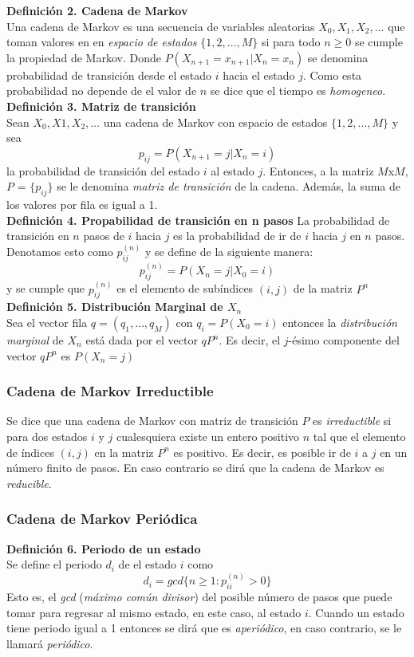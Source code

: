 \documentclass{article}
\theoremstyle{definition}
\theoremstyle{remark}
\begin{document}
\textbf{Definición 2. Cadena de Markov}\\
Una cadena de Markov es una secuencia de variables aleatorias $X_{0},X_{1},X_{2},...$ que toman valores en en \textit{espacio de estados} $\{1,2,\dots,M\}$ si para todo $n\geq0$ se cumple la propiedad de Markov. Donde $P(X_{n+1}=x_{n+1}|X_{n}=x_n)$ se denomina probabilidad de transición desde el estado $i$ hacia el estado $j$. Como esta probabilidad no depende de el valor de $n$ se dice que el tiempo es \textit{homogeneo}.\\

\textbf{Definición 3. Matriz de transición}\\
Sean $X_{0},X{1},X_{2},\dots$ una cadena de Markov con espacio de estados $\{1,2,\dots,M\}$ y sea
\[
p_{ij} = P(X_{n+1}=j|X_{n}=i)
\] 
la probabilidad de transición del estado $i$ al estado $j$. Entonces, a la matriz $M$x$M$, $P$ = $\{p_{ij}\}$ se le denomina \textit{matriz de transición} de la cadena. Además, la suma de los valores por fila es igual a 1.\\

\textbf{Definición 4. Propabilidad de transición en n pasos}
La probabilidad de transición en $n$ pasos de $i$ hacia $j$ es la probabilidad de ir de $i$ hacia $j$ en $n$ pasos. Denotamos esto como $p_{ij}^{(n)}$ y se define de la siguiente manera:
\[
p_{ij}^{(n)} = P(X_{n}=j|X_{0}=i)
\]
y se cumple que $p_{ij}^{(n)}$ es el elemento de subíndices $(i,j)$ de la matriz $P^{n}$\\

\textbf{Definición 5. Distribución Marginal de $X_{n}$}\\
Sea el vector fila $q = (q_{1},\dots,q_{M})$ con $q_{i} = P(X_{0} = i)$ entonces la \textit{distribución marginal} de $X_{n}$ está dada por el vector $qP^{n}$. Es decir, el $j$-ésimo componente del vector $qP^{n}$ es $P(X_{n} = j)$
\subsubsection{Cadena de Markov Irreductible}
Se dice que una cadena de Markov con matriz de transición $P$ es \textit{irreductible} si para dos estados $i$ y $j$ cualesquiera existe un entero positivo $n$ tal que el elemento de índices $(i,j)$ en la matriz $P^n$ es positivo. Es decir, es posible ir de $i$ a $j$ en un número finito de pasos. En caso contrario se dirá que la cadena de Markov es \textit{reducible}.

\subsubsection{Cadena de Markov Periódica}
\textbf{Definición 6. Periodo de un estado}\\
Se define el periodo $d_{i}$ de el estado $i$ como
\[
d_{i} = gcd\{n\geq1:p_{ii}^{(n)}>0\}
\]
Esto es, el \textit{gcd} (\textit{máximo común divisor}) del posible número de pasos que puede tomar para regresar al mismo estado, en este caso, al estado $i$. 
Cuando un estado tiene periodo igual a 1 entonces se dirá que es \textit{aperiódico}, en caso contrario, se le llamará \textit{periódico}.\\
\end{document}
